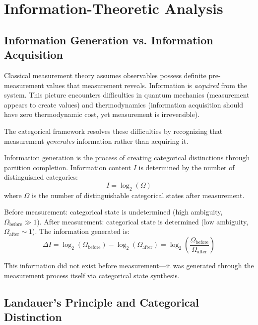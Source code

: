\section{Information-Theoretic Analysis}
\label{sec:information}

\subsection{Information Generation vs. Information Acquisition}

Classical measurement theory assumes observables possess definite pre-measurement values that measurement reveals. Information is \textit{acquired} from the system. This picture encounters difficulties in quantum mechanics (measurement appears to create values) and thermodynamics (information acquisition should have zero thermodynamic cost, yet measurement is irreversible).

The categorical framework resolves these difficulties by recognizing that measurement \textit{generates} information rather than acquiring it.

\begin{definition}
\label{def:info_generation}
Information generation is the process of creating categorical distinctions through partition completion. Information content $I$ is determined by the number of distinguished categories:
\begin{equation}
I = \log_2(\Omega)
\end{equation}
where $\Omega$ is the number of distinguishable categorical states after measurement.
\end{definition}

Before measurement: categorical state is undetermined (high ambiguity, $\Omega_{\text{before}} \gg 1$). After measurement: categorical state is determined (low ambiguity, $\Omega_{\text{after}} \sim 1$). The information generated is:
\begin{equation}
\Delta I = \log_2(\Omega_{\text{before}}) - \log_2(\Omega_{\text{after}}) = \log_2\left(\frac{\Omega_{\text{before}}}{\Omega_{\text{after}}}\right)
\end{equation}

This information did not exist before measurement—it was generated through the measurement process itself via categorical state synthesis.

\subsection{Landauer's Principle and Categorical Distinction}

